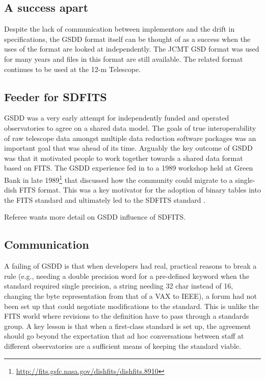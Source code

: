 \documentclass[final,authoryear,5p,times,twocolumn]{elsarticle}
\begin{document}
\subsection{A success apart}

Despite the lack of communication between implementors and the drift
in specifications, the GSDD format itself can be thought of as a
success when the uses of the format are looked at independently. The JCMT GSD
format was used for many years and files in this format are still
available. The related format continues to be used at the 12-m Telescope.


\subsection{Feeder for SDFITS}
\label{sec:sdfits}

GSDD was a very early attempt for independently funded and operated observatories to
agree on a shared data model. The goals of true interoperability of
raw telescope data amongst multiple data reduction software packages
was an important goal that was ahead of its time. Arguably the key
outcome of GSDD was that it motivated people to work together towards
a shared data format based on FITS. The GSDD experience fed in to a
1989 workshop held at Green Bank in late
1989\footnote{\url{http://fits.gsfc.nasa.gov/dishfits/dishfits.8910}}
that discussed how the community could migrate to a
single-dish FITS format. This was a key motivator for the adoption
of binary tables into the FITS standard \citep{1995A&AS..113..159C}
and ultimately led to the SDFITS standard \citep{2000ASPC..216..243G}.

{\color{red} Referee wants more detail on GSDD influence of SDFITS.}

\subsection{Communication}

A failing of GSDD is that when developers had real, practical reasons
to break a rule (e.g., needing a double precision word for a
pre-defined keyword when the standard required single precision, a
string needing 32 char instead of 16, changing the byte representation
from that of a VAX to IEEE), a forum had not been set up that could
negotiate modifications to the standard.  This is unlike the FITS
world where revisions to the definition have to pass through a
standards group.  A key lesson is that when a first-class standard is
set up, the agreement should go beyond the expectation that ad hoc
conversations between staff at different observatories are a
sufficient means of keeping the standard viable.
\end{document}
